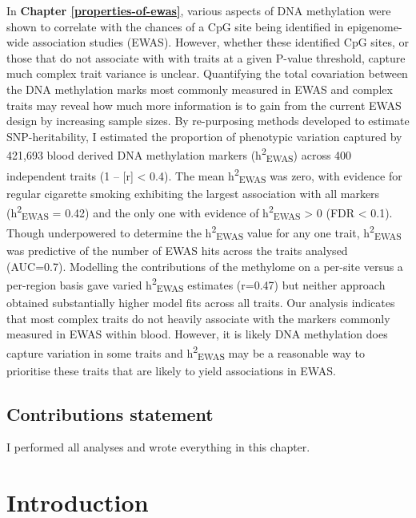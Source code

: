 \documentclass[11pt,twoside]{bristolthesis}
\begin{document}
In \textbf{Chapter \ref{properties-of-ewas}}, various aspects of DNA methylation were shown to correlate with the chances of a CpG site being identified in epigenome-wide association studies (EWAS). However, whether these identified CpG sites, or those that do not associate with with traits at a given P-value threshold, capture much complex trait variance is unclear. Quantifying the total covariation between the DNA methylation marks most commonly measured in EWAS and complex traits may reveal how much more information is to gain from the current EWAS design by increasing sample sizes. By re-purposing methods developed to estimate SNP-heritability, I estimated the proportion of phenotypic variation captured by 421,693 blood derived DNA methylation markers (h\textsuperscript{2}\textsubscript{EWAS}) across 400 independent traits (1 -- {[}r{]} \textless{} 0.4). The mean h\textsuperscript{2}\textsubscript{EWAS} was zero, with evidence for regular cigarette smoking exhibiting the largest association with all markers (h\textsuperscript{2}\textsubscript{EWAS} = 0.42) and the only one with evidence of h\textsuperscript{2}\textsubscript{EWAS} \textgreater{} 0 (FDR \textless{} 0.1). Though underpowered to determine the h\textsuperscript{2}\textsubscript{EWAS} value for any one trait, h\textsuperscript{2}\textsubscript{EWAS} was predictive of the number of EWAS hits across the traits analysed (AUC=0.7). Modelling the contributions of the methylome on a per-site versus a per-region basis gave varied h\textsuperscript{2}\textsubscript{EWAS} estimates (r=0.47) but neither approach obtained substantially higher model fits across all traits. Our analysis indicates that most complex traits do not heavily associate with the markers commonly measured in EWAS within blood. However, it is likely DNA methylation does capture variation in some traits and h\textsuperscript{2}\textsubscript{EWAS} may be a reasonable way to prioritise these traits that are likely to yield associations in EWAS.

\hypertarget{contributions-statement-05}{%
\subsection{Contributions statement}\label{contributions-statement-05}}

I performed all analyses and wrote everything in this chapter.

\hypertarget{introduction-05}{%
\section{Introduction}\label{introduction-05}}
\end{document}
